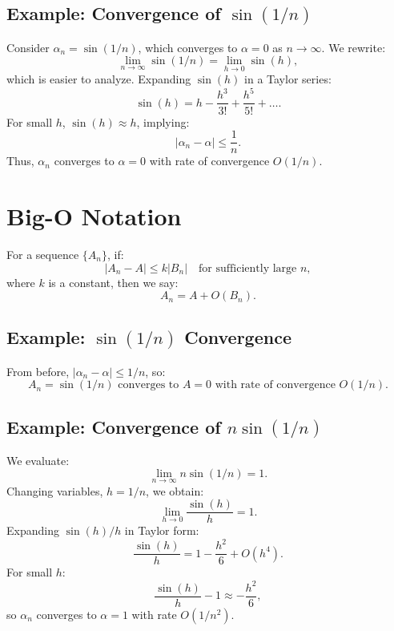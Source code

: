 \subsection{Example: Convergence of $\sin(1/n)$}

Consider $\alpha_n = \sin(1/n)$, which converges to $\alpha = 0$ as $n \to \infty$.
We rewrite:
\begin{equation*}
    \lim_{n \to \infty} \sin(1/n) = \lim_{h \to 0} \sin(h),
\end{equation*}
which is easier to analyze. Expanding $\sin(h)$ in a Taylor series:
\begin{equation*}
    \sin(h) = h - \frac{h^3}{3!} + \frac{h^5}{5!} + \dots.
\end{equation*}
For small $h$, $\sin(h) \approx h$, implying:
\begin{equation*}
    |\alpha_n - \alpha| \leq \frac{1}{n}.
\end{equation*}
Thus, $\alpha_n$ converges to $\alpha = 0$ with rate of convergence $O(1/n)$.

\section{Big-O Notation}

For a sequence $\{A_n\}$, if:
\begin{equation*}
    |A_n - A| \leq k |B_n| \quad \text{for sufficiently large } n,
\end{equation*}
where $k$ is a constant, then we say:
\begin{equation*}
    A_n = A + O(B_n).
\end{equation*}

\subsection{Example: $\sin(1/n)$ Convergence}

From before, $|\alpha_n - \alpha| \leq 1/n$, so:
\begin{equation*}
    A_n = \sin(1/n) \text{ converges to } A = 0 
    \text{ with rate of convergence } O(1/n).
\end{equation*}

\subsection{Example: Convergence of $n \sin(1/n)$}

We evaluate:
\begin{equation*}
    \lim_{n \to \infty} n \sin(1/n) = 1.
\end{equation*}
Changing variables, $h = 1/n$, we obtain:
\begin{equation*}
    \lim_{h \to 0} \frac{\sin(h)}{h} = 1.
\end{equation*}
Expanding $\sin(h)/h$ in Taylor form:
\begin{equation*}
    \frac{\sin(h)}{h} = 1 - \frac{h^2}{6} + O(h^4).
\end{equation*}
For small $h$:
\begin{equation*}
    \frac{\sin(h)}{h} - 1 \approx -\frac{h^2}{6},
\end{equation*}
so $\alpha_n$ converges to $\alpha = 1$ with rate $O(1/n^2)$.

